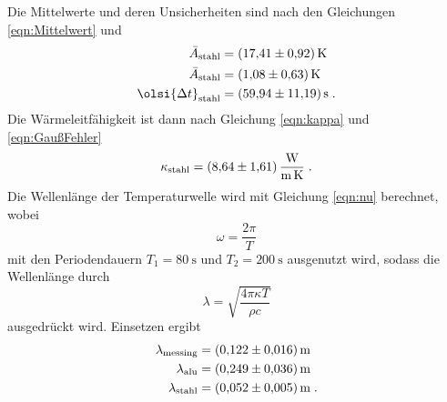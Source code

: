 \noindent
Die Mittelwerte und deren Unsicherheiten sind nach den Gleichungen \eqref{eqn:Mittelwert} und %
\begin{align*}
  \bar{A}_\text{stahl}         &=\SI{17.41 \pm 0.92}{\kelvin}\\
  \bar{A}_\text{stahl}         &=\SI{1.08  \pm 0.63}{\kelvin}\\
  \olsi{\Delta t}_\text{stahl} &=\SI{59.94\pm 11.19}{\second} \;.
\end{align*}
Die Wärmeleitfähigkeit ist dann nach Gleichung \eqref{eqn:kappa} und \eqref{eqn:GaußFehler}
\begin{equation*}
  \kappa_\text{stahl}=\SI{8.64 \pm 1.61}{\watt\per\metre\per\kelvin}  \;.
\end{equation*}
Die Wellenlänge der Temperaturwelle wird mit Gleichung \eqref{eqn:nu} berechnet, wobei 
\begin{equation*}
  \omega=\frac{2\pi}{T}
\end{equation*}
mit den Periodendauern $T_1=\SI{80}{\second}$ und $T_2=\SI{200}{\second}$ ausgenutzt wird, sodass die Wellenlänge durch
\begin{equation*}
  \lambda=\sqrt{\frac{4\pi\kappa T}{\rho c}}
\end{equation*}
ausgedrückt wird. Einsetzen ergibt 
\begin{align*}
\lambda_\text{messing} &=\SI{0.122\pm 0.016}{\metre}\\  
\lambda_\text{alu}     &=\SI{0.249\pm 0.036}{\metre}\\
\lambda_\text{stahl}   &=\SI{0.052\pm 0.005}{\metre}   \;.
\end{align*}